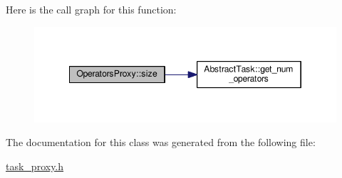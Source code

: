 Here is the call graph for this function\-:
\nopagebreak
\begin{figure}[H]
\begin{center}
\leavevmode
\includegraphics[width=346pt]{classOperatorsProxy_a25f2894eab5294000cabbd01557e08f8_cgraph}
\end{center}
\end{figure}




The documentation for this class was generated from the following file\-:\begin{DoxyCompactItemize}
\item 
\hyperlink{task__proxy_8h}{task\-\_\-proxy.\-h}\end{DoxyCompactItemize}
